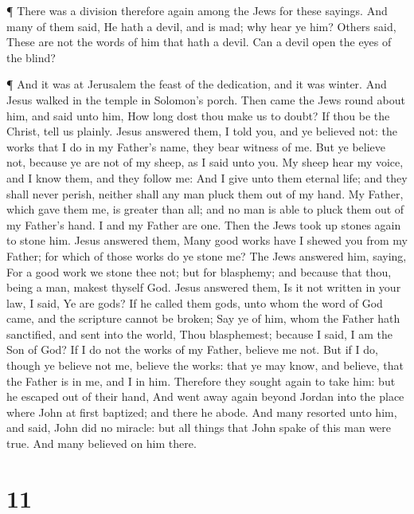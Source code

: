  ¶ There was a division therefore again among the Jews for
these sayings.  And many of them said, He hath a devil, and
is mad; why hear ye him?  Others said, These are not the
words of him that hath a devil. Can a devil open the eyes of the blind?

 ¶ And it was at Jerusalem the feast of the dedication, and
it was winter.  And Jesus walked in the temple in Solomon's
porch.  Then came the Jews round about him, and said unto
him, How long dost thou make us to doubt? If thou be the Christ, tell us
plainly.  Jesus answered them, I told you, and ye believed
not: the works that I do in my Father's name, they bear witness of me.
 But ye believe not, because ye are not of my sheep, as I
said unto you.  My sheep hear my voice, and I know them,
and they follow me:  And I give unto them eternal life; and
they shall never perish, neither shall any man pluck them out of my
hand.  My Father, which gave them me, is greater than all;
and no man is able to pluck them out of my Father's hand. 
I and my Father are one.  Then the Jews took up stones
again to stone him.  Jesus answered them, Many good works
have I shewed you from my Father; for which of those works do ye stone
me?  The Jews answered him, saying, For a good work we
stone thee not; but for blasphemy; and because that thou, being a man,
makest thyself God.  Jesus answered them, Is it not written
in your law, I said, Ye are gods?  If he called them gods,
unto whom the word of God came, and the scripture cannot be broken;
 Say ye of him, whom the Father hath sanctified, and sent
into the world, Thou blasphemest; because I said, I am the Son of God?
 If I do not the works of my Father, believe me not.
 But if I do, though ye believe not me, believe the works:
that ye may know, and believe, that the Father is in me, and I in him.
 Therefore they sought again to take him: but he escaped
out of their hand,  And went away again beyond Jordan into
the place where John at first baptized; and there he abode.
 And many resorted unto him, and said, John did no miracle:
but all things that John spake of this man were true.  And
many believed on him there.

\hypertarget{section-10}{%
\section{11}\label{section-10}}

